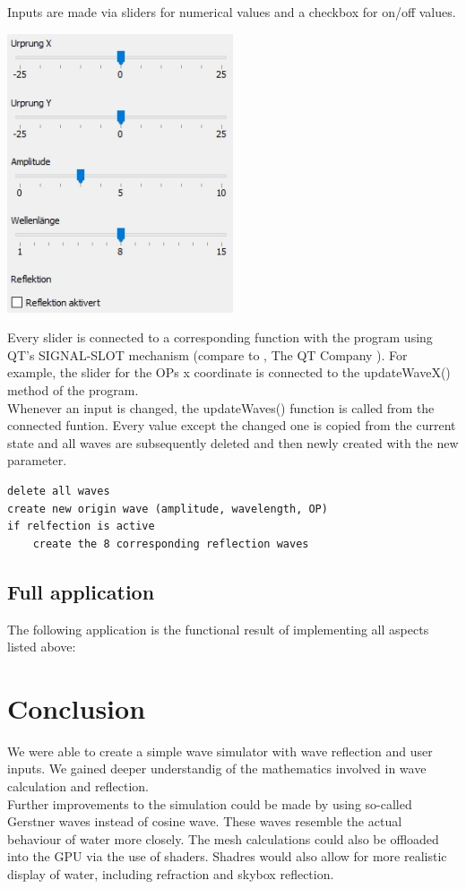 \documentclass[12pt,a4paper]{scrartcl}
\begin{document}
Inputs are made via sliders for numerical values and a checkbox for on/off values.
\begin{center}
	\includegraphics[width=0.5\textwidth]{Images/Inputs.jpg}
\end{center}

Every slider is connected to a corresponding function with the program using QT's SIGNAL-SLOT mechanism (compare to , The QT Company ). For example, the slider for the OPs x coordinate is connected to the updateWaveX() method of the program.\\
Whenever an input is changed, the updateWaves() function is called from the connected funtion. Every value except the changed one is copied from the current state and all waves are subsequently deleted and then newly created with the new parameter.

\begin{lstlisting}[language=PSEUDO]
delete all waves
create new origin wave (amplitude, wavelength, OP)
if relfection is active
	create the 8 corresponding reflection waves
\end{lstlisting}

\subsection{Full application}
The following application is the functional result of implementing all aspects listed above:

\section{Conclusion}
We were able to create a simple wave simulator with wave reflection and user inputs. We gained deeper understandig of the mathematics involved in wave calculation and reflection.\\
Further improvements to the simulation could be made by using so-called Gerstner waves instead of cosine wave. These waves resemble the actual behaviour of water more closely. The mesh calculations could also be offloaded into the GPU via the use of shaders. Shadres would also allow for more realistic display of water, including refraction and skybox reflection.\\
\end{document}
